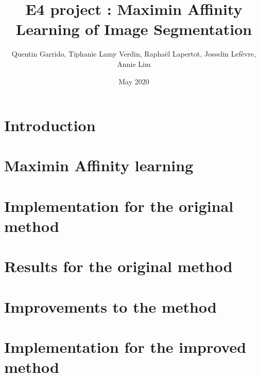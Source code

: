 \documentclass{article}
\title{E4 project : Maximin Affinity Learning of Image Segmentation}
\author{Quentin Garrido, Tiphanie Lamy Verdin, Raphaël Lapertot, Josselin Lefèvre, Annie Lim}
\date{May 2020}
\begin{document}
\setcounter{tocdepth}{2}
\maketitle
\pagebreak
\tableofcontents
\pagebreak


\section{Introduction}



\section{Maximin Affinity learning}



\section{Implementation for the original method}



\clearpage
\section{Results for the original method}



\clearpage
\section{Improvements to the method}



\section{Implementation for the improved method}
 


\clearpage
\end{document}
